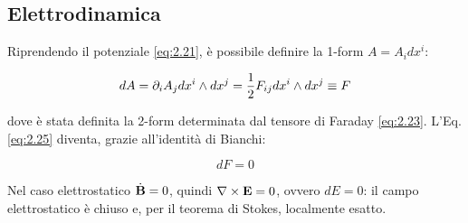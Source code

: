 \subsection{Elettrodinamica}

Riprendendo il potenziale \ref{eq:2.21}, è possibile definire la 1-form $ A = A_i dx^i $:

\begin{equation}
	dA = \partial_i A_j dx^i \wedge dx^j = \frac{1}{2} F_{ij} dx^i \wedge dx^j \equiv F
	\label{eq:3.13}
\end{equation}

dove è stata definita la 2-form determinata dal tensore di Faraday \ref{eq:2.23}. L'Eq. \ref{eq:2.25} diventa, grazie all'identità di Bianchi:

\begin{equation}
	dF = 0
	\label{eq:3.14}
\end{equation}

Nel caso elettrostatico $ \dot{\mathbf{B}} = 0 $, quindi $ \nabla\times\mathbf{E} = 0 $, ovvero $ dE = 0 $: il campo elettrostatico è chiuso e, per il teorema di Stokes, localmente esatto.










